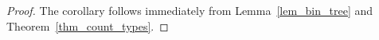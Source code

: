 \documentclass[creche.tex]{subfiles}
\begin{document}
\begin{proof}
  The corollary follows immediately from Lemma~\ref{lem_bin_tree} and Theorem~\ref{thm_count_types}.
\end{proof}



\end{document}
